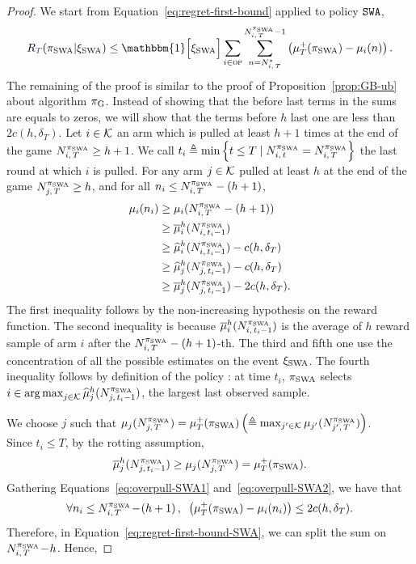 \begin{proof}
We start from Equation~\ref{eq:regret-first-bound} applied to policy $\normalfont \texttt{SWA}$,
\begin{equation}
\label{eq:regret-first-bound-SWA}
\regret(\piSWA| \HPSWA) \leq  \mathbbm{1} \Big[\HPSWA\Big] \sum_{i\in \overpullSet}    \sum_{n=\NiT^\star}^{\NiT^{\piSWA}-1} \pa{\mu^+_T(\piSWA) - \mu_i(n)}.
\end{equation}
%
The remaining of the proof is similar to the proof of Proposition~\ref{prop:GB-ub} about algorithm $\pi_{\rm G}$. Instead of showing that the before last terms in the sums are equals to zeros, we will show that the terms before $h$ last one are less than $2c(h, \delta_T)$. Let $i \in \mathcal{K}$ an arm which is pulled at least $h+1$ times at the end of the game $N_{i,\,T}^{\pi_{\rm SWA}} \geq h+1$. We call $t_i \triangleq \min\left\{t\leq T\; |\; N_{i,\,t}^{\pi_{\rm SWA}} = N_{i,\,T}^{\pi_{\rm SWA}}\right\}$ the last round at which $i$ is pulled. For any arm $j \in \mathcal{K}$ pulled at least $h$ at the end of the game $N_{j,\,T}^{\pi_{\rm SWA}} \geq h$, and for all $n_i \leq N_{i,\,T}^{\pi_{\rm SWA}} -(h+1)$, 
\begin{align}
\label{eq:overpull-SWA1}
\mu_i(n_i) &\geq \mu_i(N_{i,\,T}^{\pi_{\rm SWA}} - (h+1) )\nonumber\\
 &\geq \overline{\mu}_i^h(N_{i,\,t_i -1}^{\pi_{\rm SWA}}) \nonumber\\
 &\geq \widehat{\mu}_i^h(N_{i,\,t_i -1}^{\pi_{\rm SWA}}) - c(h, \delta_T) \nonumber\\
& \geq \widehat{\mu}_j^h(N_{j,\,t_i -1}^{\pi_{\rm SWA}}) - c(h, \delta_T)  \nonumber\\
& \geq \overline{\mu}_j^h(N_{j,\,t_i -1}^{\pi_{\rm SWA}}) - 2c(h, \delta_T). 
\end{align}
The first inequality follows by the non-increasing hypothesis on the reward function. The second inequality is because $\overline{\mu}_i^h(N_{i,\,t_i -1}^{\pi_{\rm SWA}})$ is the average of $h$ reward sample of arm $i$ after the $N_{i,\,T}^{\pi_{\rm SWA}} - (h+1)$-th. The third and fifth one use the concentration of all the possible estimates on the event $\xi_{\rm SWA}$.  The fourth  inequality follows by definition of the policy : at time $t_i$, $\pi_{\rm SWA}$ selects $i \in \operatorname*{arg\,max}_{j \in \mathcal{K}} \widehat{\mu}_j^h(N_{j,\,t_i -1}^{\pi_{\rm SWA}})$, the largest last observed sample. 

We choose $j$ such that $ \mu_j(N_{j,\,T}^{\pi_{\rm SWA}}) = \mu^+_T(\pi_{\rm SWA}) \left(\triangleq \max_{j'\in \mathcal{K}} \mu_{j'}(N_{j',\,T}^{\pi_{\rm SWA}})\right)$. \\Since $t_i \leq T$, by the rotting assumption, 
\begin{equation}
\label{eq:overpull-SWA2}
 \overline{\mu}_j^h(N_{j,\,t_i -1}^{\pi_{\rm SWA}}) \geq \mu_j(N_{j,\,T}^{\pi_{\rm SWA}}) = \mu^+_T(\pi_{\rm SWA}).
\end{equation}
%
Gathering Equations~\ref{eq:overpull-SWA1} and~\ref{eq:overpull-SWA2}, we have that 
\begin{equation}
\label{eq:overpull-SWA3}
\forall n_i \leq N_{i,\,T}^{\pi_{\rm SWA}} \!-\! \left(h+1\right), \;\;   \left(\mu^+_T(\pi_{\rm SWA}) - \mu_i(n_i)\right) \leq 2c(h, \delta_T).
\end{equation}
Therefore,  in Equation~\ref{eq:regret-first-bound-SWA}, we can split the sum on $N_{i,\,T}^{\pi_{\rm SWA}} \!-\! h$. Hence, 


\end{proof}
